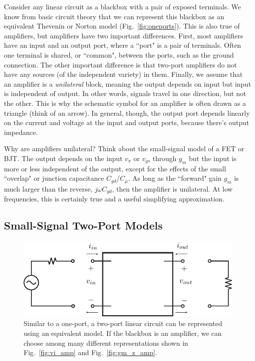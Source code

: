 Consider any linear circuit as a blackbox with a pair of exposed terminals.  We know from basic circuit theory that we can represent this blackbox as an equivalent Thevenin or Norton model (Fig.~\ref{fig:oneports}).  This is also true of amplifiers, but amplifiers have two important differences.  First, most amplifiers have an input and an output port, where a ``port" is a  pair of terminals.  Often one terminal is shared, or ``common", between the ports, such as the ground connection.   The other important difference is that two-port amplifiers do not have any sources (of the independent variety) in them.  Finally, we assume that an amplifier is a \textit{unilateral} block, meaning the output depends on input but input is independent of output.  In other words, signals travel in one direction, but not the other.  This is why the schematic symbol for an amplifier is often drawn as a triangle (think of an arrow).  In general, though, the output port depends linearly on the current and voltage at the input and output ports, because there's output impedance.  

Why are amplifiers unilateral?  Think about the small-signal model of a FET or BJT.  The output depends on the input $v_{\pi}$ or $v_{gs}$ through $g_m$ but the input is more or less independent of the output, except for the effects of the small ``overlap" or junction capacitance $C_{gd}$/$C_\mu$.  As long as the ``forward" gain $g_m$ is much larger than the reverse, $j\omega C_{gd}$, then the amplifier is unilateral.  At low frequencies, this is certainly true and a useful simplifying approximation.
\subsection{Small-Signal Two-Port Models}
\begin{figure}[tb]
\begin{center}
\includegraphics[scale=1]{2port_ss}
\end{center}
\caption{Similar to a one-port, a two-port linear circuit can be represented using an equivalent model.  If the blackbox is an amplifier, we can choose among many different representations shown in Fig.~\ref{fig:vi_amp} and Fig.~\ref{fig:gm_z_amp}.}
\label{fig:2port_ss}
\end{figure}
 
